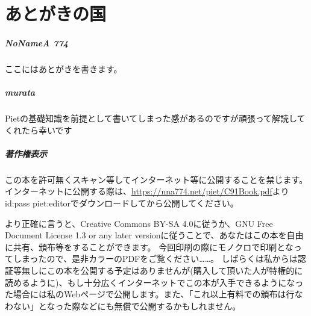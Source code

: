 \chapter*{あとがきの国}

\paragraph{NoNameA 774}

ここにはあとがきを書きます。

\paragraph{murata}

Pietの基礎知識を前提として書いてしまった感があるのですが頑張って解読してくれたら幸いです

\paragraph{著作権表示}

{\small この本を許可無くスキャン等してインターネット等に公開することを禁じます。
インターネットに公開する際は、\url{https://nna774.net/piet/C91Book.pdf}よりid:pass piet:editorでダウンロードしてから公開してください。}

{\footnotesize より正確に言うと、Creative Commons BY-SA 4.0に従うか、GNU Free Document License 1.3 or any later versionに従うことで、あなたはこの本を自由に共有、頒布等をすることができます。
  今回印刷の際にモノクロで印刷となってしまったので、是非カラーのPDFをご覧ください……。
しばらくは私からは認証等無しにこの本を公開する予定はありませんが(購入して頂いた人が特権的に読めるように)、もし十分広くインターネットでこの本が入手できるようになった場合には私のWebページで公開します。また、「これ以上有料での頒布は行なわない」となった際などにも無償で公開するかもしれません。}
